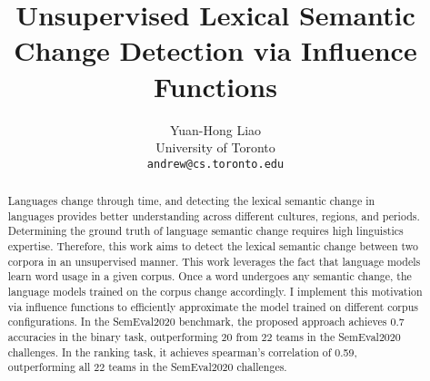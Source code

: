 \documentclass[11pt]{article}
\title{Unsupervised Lexical Semantic Change Detection via Influence Functions}
\author{
  Yuan-Hong Liao \\
  University of Toronto \\
  \texttt{andrew@cs.toronto.edu}}
\begin{document}
\maketitle
\begin{abstract}
  Languages change through time, and detecting the lexical semantic change in languages provides better understanding across different cultures, regions, and periods.
 Determining the ground truth of language semantic change requires high linguistics expertise. 
 Therefore, this work aims to detect the lexical semantic change between two corpora in an unsupervised manner.
 This work leverages the fact that language models learn word usage in a given corpus. 
 Once a word undergoes any semantic change, the language models trained on the corpus change accordingly.
 I implement this motivation via influence functions to efficiently approximate the model trained on different corpus configurations.
 In the SemEval2020 benchmark, the proposed approach achieves 0.7 accuracies in the binary task, outperforming 20 from 22 teams in the SemEval2020 challenges.
 In the ranking task, it achieves spearman's correlation of 0.59, outperforming all 22 teams in the SemEval2020 challenges.
\end{abstract}








\clearpage




\end{document}
